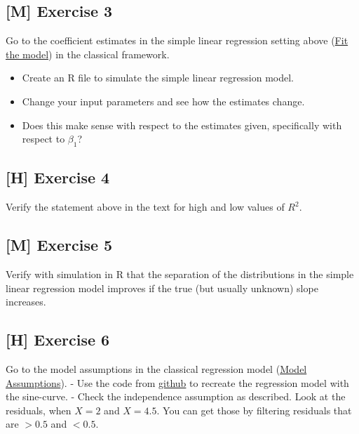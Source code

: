 \documentclass[
]{book}
\providecommand{\tightlist}{%
  \setlength{\itemsep}{0pt}\setlength{\parskip}{0pt}}
\begin{document}
\subsection{{[}M{]} Exercise 3}\label{exercise3_simpl_lin_reg}

Go to the coefficient estimates in the simple linear regression setting
above (\hyperref[fit_model_simple_lin_reg_classic]{Fit the model})
in the classical framework.

\begin{itemize}
\tightlist
\item
  Create an R file to simulate the simple linear regression model.
\item
  Change your input parameters and see how the estimates change.
\item
  Does this make sense with respect to the estimates given, specifically with respect
  to \(\beta_1\)?
\end{itemize}

\subsection{{[}H{]} Exercise 4}\label{exercise4_simpl_lin_reg}

Verify the statement above in the text for high and low values of \(R^2\).

\subsection{{[}M{]} Exercise 5}\label{exercise5_simpl_lin_reg}

Verify with simulation in R that the separation of the distributions in the simple linear regression model
improves if the true (but usually unknown) slope increases.

\subsection{{[}H{]} Exercise 6}\label{exercise6_simpl_lin_reg}

Go to the model assumptions in the classical regression model (\hyperref[_model_assumptions]{Model Assumptions}).
- Use the code from \href{https://github.com/jdegenfellner/Script_QM2_ZHAW/blob/main/02-Simple_Linear_Regression.Rmd}{github}
to recreate the regression model with the sine-curve.
- Check the independence assumption as described. Look at the residuals, when \(X=2\) and \(X=4.5\).
You can get those by filtering residuals that are \(>0.5\) and \(<0.5\).
\end{document}
